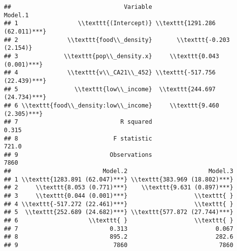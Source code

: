 \documentclass[
]{article}
\begin{document}
\begin{verbatim}
##                                Variable                        Model.1
## 1                 \\texttt{(Intercept)} \\texttt{1291.286 (62.011)***}
## 2              \\texttt{food\\_density}       \\texttt{-0.203 (2.154)}
## 3             \\texttt{pop\\_density.x}     \\texttt{0.043 (0.001)***}
## 4              \\texttt{v\\_CA21\\_452} \\texttt{-517.756 (22.439)***}
## 5                \\texttt{low\\_income}  \\texttt{244.697 (24.734)***}
## 6 \\texttt{food\\_density:low\\_income}     \\texttt{9.460 (2.305)***}
## 7                             R squared                          0.315
## 8                           F statistic                          721.0
## 9                          Observations                           7860
##                          Model.2                       Model.3
## 1 \\texttt{1283.891 (62.047)***} \\texttt{383.969 (18.802)***}
## 2     \\texttt{8.053 (0.771)***}    \\texttt{9.631 (0.897)***}
## 3     \\texttt{0.044 (0.001)***}                   \\texttt{ }
## 4 \\texttt{-517.272 (22.461)***}                   \\texttt{ }
## 5  \\texttt{252.689 (24.682)***} \\texttt{577.872 (27.744)***}
## 6                    \\texttt{ }                   \\texttt{ }
## 7                          0.313                         0.067
## 8                          895.2                         282.6
## 9                           7860                          7860
\end{verbatim}
\end{document}
